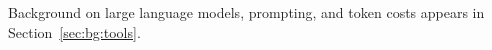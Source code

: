Background on large language models, prompting, and token costs
appears in Section~\ref{sec:bg:tools}.
\iffalse
